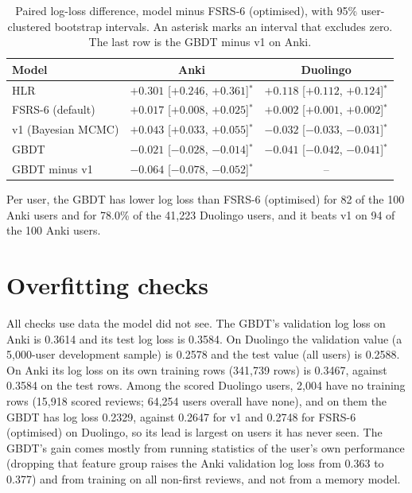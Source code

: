 \documentclass[11pt,a4paper]{article}
\begin{document}
\begin{table}[htbp]
  \centering
  \caption{Paired log-loss difference, model minus FSRS-6 (optimised), with 95\% user-clustered bootstrap intervals. An asterisk marks an interval that excludes zero. The last row is the GBDT minus v1 on Anki.}
  \label{tab:paired}
  \small
  \begin{tabular}{@{}lcc@{}}
    \toprule
    Model & Anki & Duolingo \\
    \midrule
    HLR & $+0.301$ [$+0.246$, $+0.361$]$^{*}$ & $+0.118$ [$+0.112$, $+0.124$]$^{*}$ \\
    FSRS-6 (default) & $+0.017$ [$+0.008$, $+0.025$]$^{*}$ & $+0.002$ [$+0.001$, $+0.002$]$^{*}$ \\
    v1 (Bayesian MCMC) & $+0.043$ [$+0.033$, $+0.055$]$^{*}$ & $-0.032$ [$-0.033$, $-0.031$]$^{*}$ \\
    GBDT & $-0.021$ [$-0.028$, $-0.014$]$^{*}$ & $-0.041$ [$-0.042$, $-0.041$]$^{*}$ \\
    \midrule
    GBDT minus v1 & $-0.064$ [$-0.078$, $-0.052$]$^{*}$ & -- \\
    \bottomrule
  \end{tabular}
\end{table}

Per user, the GBDT has lower log loss than FSRS-6 (optimised) for 82 of the 100 Anki users and for 78.0\% of the 41,223 Duolingo users, and it beats v1 on 94 of the 100 Anki users.

\section{Overfitting checks}
All checks use data the model did not see. The GBDT's validation log loss on Anki is 0.3614 and its test log loss is 0.3584. On Duolingo the validation value (a 5,000-user development sample) is 0.2578 and the test value (all users) is 0.2588.
On Anki its log loss on its own training rows (341,739 rows) is 0.3467, against 0.3584 on the test rows. Among the scored Duolingo users, 2,004 have no training rows (15,918 scored reviews; 64,254 users overall have none), and on them the GBDT has log loss 0.2329, against 0.2647 for v1 and 0.2748 for
FSRS-6 (optimised) on Duolingo, so its lead is largest on users it has never seen. The GBDT's gain comes mostly from running statistics of the user's own performance (dropping that feature group raises the Anki validation log loss from 0.363 to 0.377) and from training on all non-first reviews,
and not from a memory model.
\end{document}
